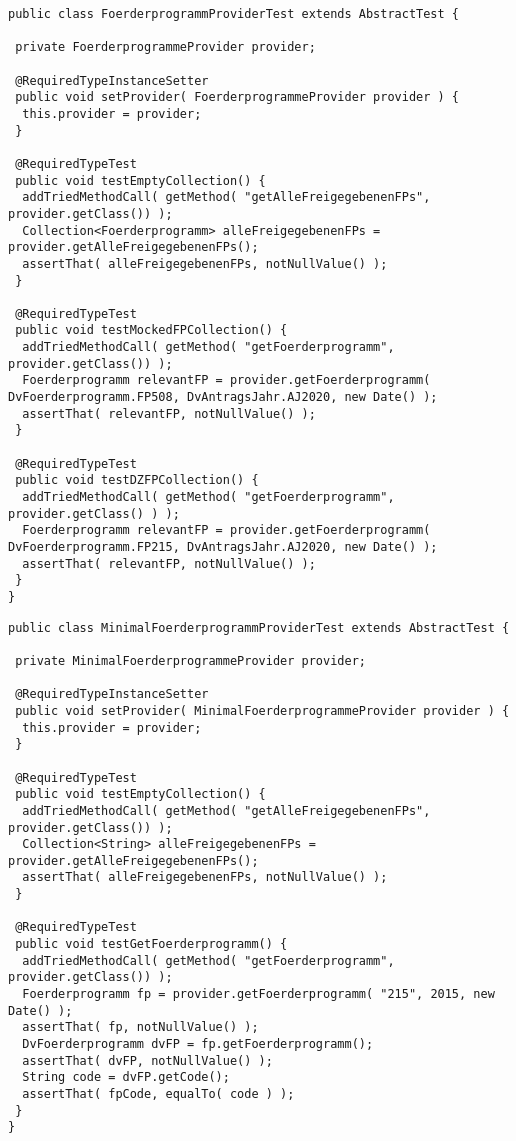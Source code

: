 \begin{lstlisting}[style = java, caption = Interface FoerderprogrammProviderTest, captionpos = b, label = lst_testklassen_tei2]
public class FoerderprogrammProviderTest extends AbstractTest {

 private FoerderprogrammeProvider provider;

 @RequiredTypeInstanceSetter
 public void setProvider( FoerderprogrammeProvider provider ) {
  this.provider = provider;
 }

 @RequiredTypeTest
 public void testEmptyCollection() {
  addTriedMethodCall( getMethod( "getAlleFreigegebenenFPs", provider.getClass()) );
  Collection<Foerderprogramm> alleFreigegebenenFPs = provider.getAlleFreigegebenenFPs();
  assertThat( alleFreigegebenenFPs, notNullValue() );
 }

 @RequiredTypeTest
 public void testMockedFPCollection() {
  addTriedMethodCall( getMethod( "getFoerderprogramm", provider.getClass()) );
  Foerderprogramm relevantFP = provider.getFoerderprogramm( DvFoerderprogramm.FP508, DvAntragsJahr.AJ2020, new Date() );
  assertThat( relevantFP, notNullValue() );
 }

 @RequiredTypeTest
 public void testDZFPCollection() {
  addTriedMethodCall( getMethod( "getFoerderprogramm", provider.getClass() ) );
  Foerderprogramm relevantFP = provider.getFoerderprogramm( DvFoerderprogramm.FP215, DvAntragsJahr.AJ2020, new Date() );
  assertThat( relevantFP, notNullValue() );
 }
}
\end{lstlisting}
\pagebreak
\begin{lstlisting}[style = java, caption = Interface MinimalFoerderprogrammProviderTest, captionpos = b, label = lst_testklassen_tei3]
public class MinimalFoerderprogrammProviderTest extends AbstractTest {

 private MinimalFoerderprogrammeProvider provider;
 
 @RequiredTypeInstanceSetter
 public void setProvider( MinimalFoerderprogrammeProvider provider ) {
  this.provider = provider;
 }

 @RequiredTypeTest
 public void testEmptyCollection() {
  addTriedMethodCall( getMethod( "getAlleFreigegebenenFPs", provider.getClass()) );
  Collection<String> alleFreigegebenenFPs = provider.getAlleFreigegebenenFPs();
  assertThat( alleFreigegebenenFPs, notNullValue() );
 }

 @RequiredTypeTest
 public void testGetFoerderprogramm() {
  addTriedMethodCall( getMethod( "getFoerderprogramm", provider.getClass()) );
  Foerderprogramm fp = provider.getFoerderprogramm( "215", 2015, new Date() );
  assertThat( fp, notNullValue() );
  DvFoerderprogramm dvFP = fp.getFoerderprogramm();
  assertThat( dvFP, notNullValue() );
  String code = dvFP.getCode();
  assertThat( fpCode, equalTo( code ) );
 }
}
\end{lstlisting}
